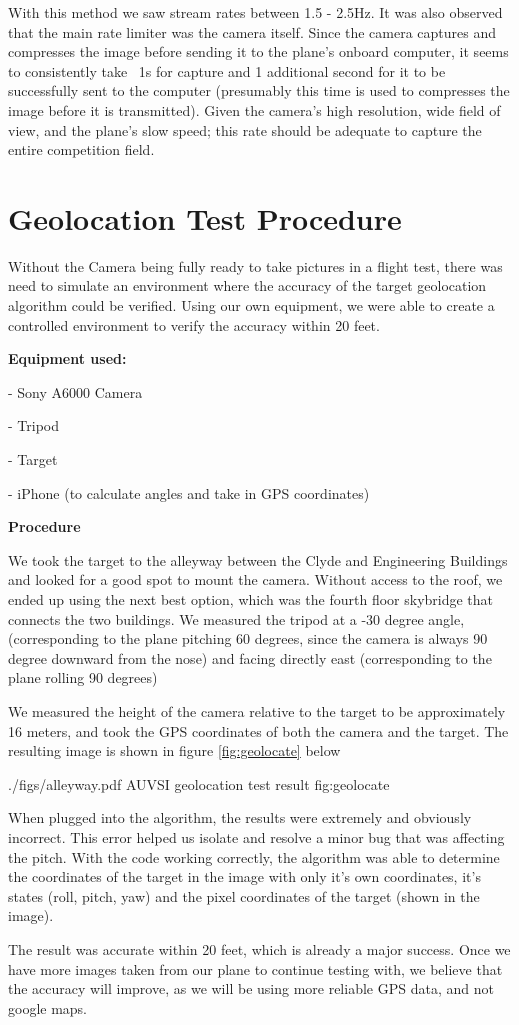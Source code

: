 \documentclass[]{auvsi_doc}
\begin{document}
With this method we saw stream rates between 1.5 - 2.5Hz. It was also observed
that the main rate limiter was the camera itself. Since the camera captures
and compresses the image before sending it to the plane's onboard computer, it 
seems to consistently take ~1s for capture and 1 additional second for it to 
be successfully sent to the computer (presumably this time is used to compresses 
the image before it is transmitted). Given the camera's high resolution, wide
field of view, and the plane's slow speed; this rate should be adequate to capture 
the entire competition field.

\section{Geolocation Test Procedure}

Without the Camera being fully ready to take pictures in a flight test, there was 
need to simulate an environment where the accuracy of the target geolocation algorithm
could be verified. Using our own equipment, we were able to create a controlled 
environment to verify the accuracy within 20 feet.

\textbf{Equipment used:}

- Sony A6000 Camera

- Tripod

- Target

- iPhone (to calculate angles and take in GPS coordinates)

\textbf{Procedure}

We took the target to the alleyway between the Clyde and Engineering Buildings 
and looked for a good spot to mount the camera. Without access to the roof, we 
ended up using the next best option, which was the fourth floor skybridge that 
connects the two buildings. We measured the tripod at a -30 degree angle, (corresponding 
to the plane pitching 60 degrees, since the camera is always 90 degree downward 
from the nose)  and facing directly east (corresponding to the plane rolling 90 
degrees)

We measured the height of the camera relative to the target to be approximately 
16 meters, and took the GPS coordinates of both the camera and the target. The 
resulting image is shown in figure \ref{fig:geolocate} below

\AUVSIFigure
{./figs/alleyway.pdf}
{\textwidth}
{AUVSI geolocation test result}
{fig:geolocate}

When plugged into the algorithm, the results were extremely and obviously incorrect. 
This error helped us isolate and resolve a minor bug that was affecting the pitch. 
With the code working correctly, the algorithm was able to determine the coordinates 
of the target in the image with only it’s own coordinates, it’s states (roll, 
pitch, yaw) and the pixel coordinates of the target (shown in the image).

The result was accurate within 20 feet, which is already a major success. Once 
we have more images taken from our plane to continue testing with, we believe 
that the accuracy will improve, as we will be using more reliable GPS data, and 
not google maps.
\end{document}
